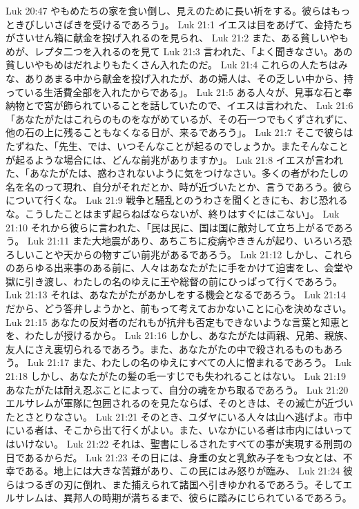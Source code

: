 Luk 20:47  やもめたちの家を食い倒し、見えのために長い祈をする。彼らはもっときびしいさばきを受けるであろう」。
Luk 21:1  イエスは目をあげて、金持たちがさいせん箱に献金を投げ入れるのを見られ、
Luk 21:2  また、ある貧しいやもめが、レプタ二つを入れるのを見て
Luk 21:3  言われた、「よく聞きなさい。あの貧しいやもめはだれよりもたくさん入れたのだ。
Luk 21:4  これらの人たちはみな、ありあまる中から献金を投げ入れたが、あの婦人は、その乏しい中から、持っている生活費全部を入れたからである」。
Luk 21:5  ある人々が、見事な石と奉納物とで宮が飾られていることを話していたので、イエスは言われた、
Luk 21:6  「あなたがたはこれらのものをながめているが、その石一つでもくずされずに、他の石の上に残ることもなくなる日が、来るであろう」。
Luk 21:7  そこで彼らはたずねた、「先生、では、いつそんなことが起るのでしょうか。またそんなことが起るような場合には、どんな前兆がありますか」。
Luk 21:8  イエスが言われた、「あなたがたは、惑わされないように気をつけなさい。多くの者がわたしの名を名のって現れ、自分がそれだとか、時が近づいたとか、言うであろう。彼らについて行くな。
Luk 21:9  戦争と騒乱とのうわさを聞くときにも、おじ恐れるな。こうしたことはまず起らねばならないが、終りはすぐにはこない」。
Luk 21:10  それから彼らに言われた、「民は民に、国は国に敵対して立ち上がるであろう。
Luk 21:11  また大地震があり、あちこちに疫病やききんが起り、いろいろ恐ろしいことや天からの物すごい前兆があるであろう。
Luk 21:12  しかし、これらのあらゆる出来事のある前に、人々はあなたがたに手をかけて迫害をし、会堂や獄に引き渡し、わたしの名のゆえに王や総督の前にひっぱって行くであろう。
Luk 21:13  それは、あなたがたがあかしをする機会となるであろう。
Luk 21:14  だから、どう答弁しようかと、前もって考えておかないことに心を決めなさい。
Luk 21:15  あなたの反対者のだれもが抗弁も否定もできないような言葉と知恵とを、わたしが授けるから。
Luk 21:16  しかし、あなたがたは両親、兄弟、親族、友人にさえ裏切られるであろう。また、あなたがたの中で殺されるものもあろう。
Luk 21:17  また、わたしの名のゆえにすべての人に憎まれるであろう。
Luk 21:18  しかし、あなたがたの髪の毛一すじでも失われることはない。
Luk 21:19  あなたがたは耐え忍ぶことによって、自分の魂をかち取るであろう。
Luk 21:20  エルサレムが軍隊に包囲されるのを見たならば、そのときは、その滅亡が近づいたとさとりなさい。
Luk 21:21  そのとき、ユダヤにいる人々は山へ逃げよ。市中にいる者は、そこから出て行くがよい。また、いなかにいる者は市内にはいってはいけない。
Luk 21:22  それは、聖書にしるされたすべての事が実現する刑罰の日であるからだ。
Luk 21:23  その日には、身重の女と乳飲み子をもつ女とは、不幸である。地上には大きな苦難があり、この民にはみ怒りが臨み、
Luk 21:24  彼らはつるぎの刃に倒れ、また捕えられて諸国へ引きゆかれるであろう。そしてエルサレムは、異邦人の時期が満ちるまで、彼らに踏みにじられているであろう。
